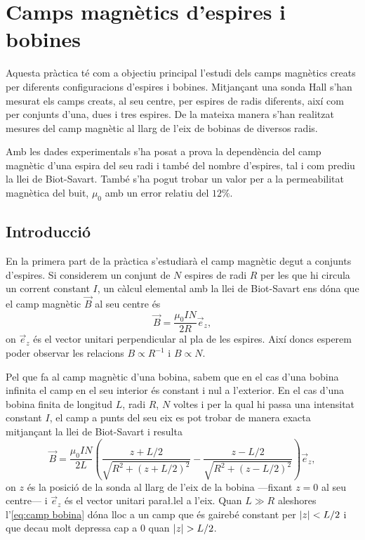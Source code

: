 \chapter{Camps magnètics d'espires i bobines}
\begin{resum}
Aquesta pràctica té com a objectiu principal l'estudi dels camps magnètics creats per diferents configuracions d'espires i bobines. Mitjançant una sonda Hall s'han mesurat els camps creats, al seu centre, per espires de radis diferents, així com per conjunts d'una, dues i tres espires. De la mateixa manera s'han realitzat mesures del camp magnètic al llarg de l'eix de bobinas de diversos radis.

Amb les dades experimentals s'ha posat a prova la dependència del camp magnètic d'una espira del seu radi i també del nombre d'espires, tal i com prediu la llei de Biot-Savart. També s'ha pogut trobar un valor per a la permeabilitat magnètica del buit, \( \mu_0 \) amb un error relatiu del $12\%$.
\end{resum}


\section{Introducció}
En la primera part de la pràctica s'estudiarà el camp magnètic degut a conjunts d'espires. Si considerem un conjunt de \( N \) espires de radi \( R \) per les que hi circula un corrent constant \( I \), un càlcul elemental amb la llei de Biot-Savart ens dóna que el camp magnètic \( \vec{B} \) al seu centre és
\begin{equation}\label{eq:camp espira}
  \vec{B}=\frac{\mu_0 I N}{2 R}\vec{e}_z,
\end{equation}
on \( \vec{e}_z \) és el vector unitari perpendicular al pla de les espires. Així doncs esperem poder observar les relacions \( B \propto R^{-1} \) i \( B \propto N \). 

Pel que fa al camp magnètic d'una bobina, sabem que en el cas d'una bobina infinita el camp en el seu interior és constant i nul a l'exterior. En el cas d'una bobina finita de longitud \( L \), radi \( R \), \( N \) voltes i per la qual hi passa una intensitat constant \( I \), el camp a punts del seu eix es pot trobar de manera exacta mitjançant la llei de Biot-Savart i resulta
\begin{equation}\label{eq:camp bobina}
  \vec{B}=\frac{\mu_0 I N}{2 L}\left(\frac{z + L/2}{\sqrt{R^2+(z+L/2)^2}} - \frac{z - L/2}{\sqrt{R^2 + (z - L/2)^2}}\right) \vec{e}_z,
\end{equation}
on \( z \) és la posició de la sonda al llarg de l'eix de la bobina ---fixant \( z = 0 \) al seu centre--- i \( \vec{e}_z \) és el vector unitari para\l.lel a l'eix. Quan \( L \gg R \) aleshores l'\cref{eq:camp bobina} dóna lloc a un camp que és gairebé constant per \( \left\lvert z \right\rvert < L/2 \) i que decau molt depressa cap a 0 quan \( \left\lvert z \right\rvert > L/2 \). 

